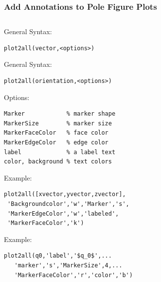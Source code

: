 \documentclass{beamer}
\begin{document}
\begin{frame}[fragile]
  \frametitle{Add Annotations to Pole Figure Plots}

  
\begin{columns}
  \begin{column}{8.5cm}

\begin{overprint}
  General Syntax:%
\begin{lstlisting}
plot2all(vector,<options>)
\end{lstlisting}
  General Syntax:
\begin{lstlisting}
plot2all(orientation,<options>)
\end{lstlisting}
\end{overprint}

Options:
\begin{lstlisting}
Marker            % marker shape
MarkerSize        % marker size
MarkerFaceColor   % face color
MarkerEdgeColor   % edge color
label             % a label text 
color, background % text colors
\end{lstlisting}

\begin{overprint}
  Example:
\begin{lstlisting}
plot2all([xvector,yvector,zvector],
 'Backgroundcolor','w','Marker','s',
 'MarkerEdgeColor','w','labeled',
 'MarkerFaceColor','k')
\end{lstlisting}
  
Example:
\begin{lstlisting}
plot2all(q0,'label','$q_0$',...
   'marker','s','MarkerSize',4,...
   'MarkerFaceColor','r','color','b')
\end{lstlisting}
  
\end{overprint}

\end{column}


\end{columns}
\end{frame}
\end{document}
